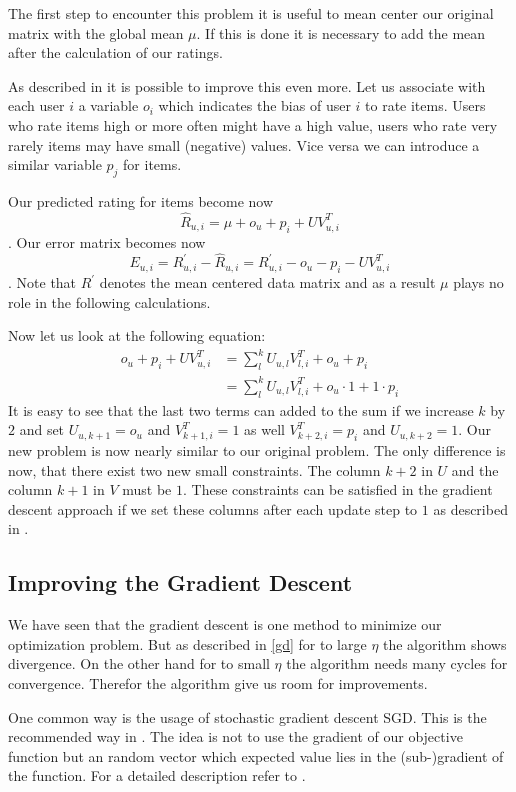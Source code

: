 \documentclass[DIV=14,twocolumn]{scrartcl}
\begin{document}
The first step to encounter this problem it is useful to mean center our original matrix with the global mean $\mu$. If this is done it is necessary to add the mean after the calculation of our ratings.

As described in \cite{Ag16} it is possible to improve this even more. Let us associate with each user $i$ a variable $o_i$ which indicates the bias of user $i$ to rate items. Users who rate items high or more often might have a high value, users who rate very rarely items may have small (negative) values. Vice versa we can introduce a similar variable $p_j$ for items.
 
Our predicted rating for items become now $$\hat{R}_{u,i} = \mu + o_u + p_i + UV^T_{u,i}$$. Our error matrix becomes now $$E_{u,i} = R_{u,i}^{'} - \hat{R}_{u,i} = R_{u,i}^{'} - o_u - p_i - UV^T_{u,i}$$. Note that $R^{'}$ denotes the mean centered data matrix and as a result $\mu$ plays no role in the following calculations.

Now let us look at the following equation:
\begin{equation*}
\begin{split}
o_u + p_i + UV^T_{u,i} &= \sum_{l}^{k}U_{u,l}V^T_{l,i} + o_u + p_i\\ &= \sum_{l}^{k}U_{u,l}V^T_{l,i} + o_u\cdot 1 + 1\cdot p_i
\end{split}
\end{equation*}
It is easy to see that the last two terms can added to the sum if we increase $k$ by $2$ and set $U_{u,k+1}=o_u$ and $V^T_{k+1,i}=1$ as well $V^T_{k+2,i}=p_i$ and $U_{u,k+2}=1$. Our new problem is now nearly similar to our original problem. The only difference is now, that there exist two new small constraints. The column $k+2$ in $U$ and the column $k+1$ in $V$ must be $1$.
These constraints can be satisfied in the gradient descent approach if we set these columns after each update step to $1$ as described in \cite{Ag16}.

\subsection{Improving the Gradient Descent}
We have seen that the gradient descent is one method to minimize our optimization problem. But as described in \ref{gd} for to large $\eta$ the algorithm shows divergence.
On the other hand for to small $\eta$ the algorithm needs many cycles for convergence. Therefor the algorithm give us room for improvements.

One common way is the usage of stochastic gradient descent SGD. This is the recommended way in \cite{KoBeVo09}. The idea is not to use the gradient of our objective function but an random vector which expected value lies in the (sub-)gradient of the function. For a detailed description refer to \cite{ShSh14}.
\end{document}
